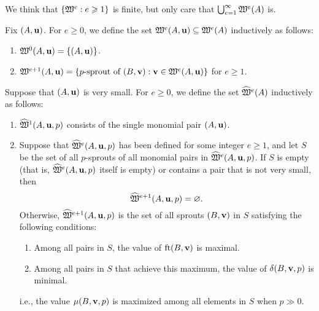\documentclass[11pt]{amsart}
\begin{document}
We think that $\{ \mathfrak{W}^e : e \geqslant 1 \}$ is finite, but only care that $\bigcup_{e=1}^\infty \mathfrak{W}^e(A)$ is.


\begin{definition}
Fix $(A, \mathbf{u})$. 
For $e\geq 0$, we define the set $\mathfrak{W}^e(A, \mathbf{u}) \subseteq \mathfrak{W}^e(A)$ inductively as follows:
\begin{enumerate}
 \item $\mathfrak{W}^0(A, \mathbf{u}) = \{ (A, \mathbf{u}) \}$.
\item $\mathfrak{W}^{e+1}(A, \mathbf{u}) = \{ p\text{-sprout of } (B, \mathbf{v}) : \mathbf{v} \in \mathfrak{W}^e(A, \mathbf{u}) \}$ for $e \geq 1$.
\end{enumerate}
\end{definition}


\begin{definition}
Suppose that $(A, \mathbf{u})$ is very small.  For $e \geq 0$, we define the set $\widehat{\mathfrak{W}}^e(A)$ inductively as follows:
\begin{enumerate}
\item $\widehat{\mathfrak{W}}^1(A, \mathbf{u}, p)$ consists of the single monomial pair $(A, \mathbf{u})$.
\item Suppose that $\widehat{\mathfrak{W}}^e(A, \mathbf{u}, p)$ has been defined for some integer $e \geq 1$, and let $S$ be the set of all $p$-sprouts of all monomial pairs in $\widehat{\mathfrak{W}}^e(A, \mathbf{u}, p)$.  If  $S$ is empty (that is, $\widehat{\mathfrak{W}}^e(A, \mathbf{u}, p)$ itself is empty) or contains a pair that is not very small, then \[ \widehat{\mathfrak{W}}^{e+1}(A, \mathbf{u}, p) = \varnothing.\]  
Otherwise, $\widehat{\mathfrak{W}}^{e+1}(A, \mathbf{u}, p)$ is the set of all sprouts $(B, \mathbf{v})$ in $S$ satisfying the following conditions:    

\begin{enumerate}
\item Among all pairs in $S$, the value of  $\operatorname{ft}(B, \mathbf{v})$ is maximal.
\item Among all pairs in $S$ that achieve this maximum, the value of $\delta(B, \mathbf{v}, p)$ is minimal.
\end{enumerate}
i.e., the value $\mu(B, \mathbf{v},p)$ is maximized among all elements in $S$ when $p \gg 0$. 
\end{enumerate}


\end{definition}

\end{document}
